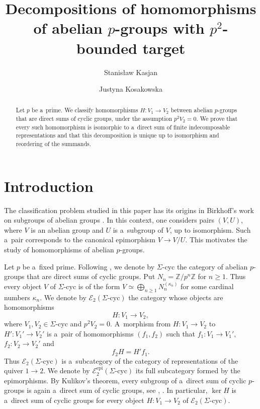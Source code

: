 \documentclass[11pt]{article}
\title{Decompositions of homomorphisms of abelian $p$-groups
	with $p^2$-bounded target}
\author{Stanisław Kasjan \and Justyna Kosakowska}
\date{}
\theoremstyle{definition}
\begin{document}
	
\maketitle


\begin{abstract}
	Let $p$ be a~prime. We classify homomorphisms $H:V_1\to V_2$
	between abelian $p$-groups that are direct sums of cyclic groups,
	under the assumption $p^2V_2=0$. We prove that every such homomorphism
	is isomorphic to a~direct sum of finite indecomposable representations
	and that this decomposition is unique up to isomorphism and reordering
	of the summands.
\end{abstract}

\section{Introduction}

The classification problem studied in this paper has its origins
in Birkhoff's work on subgroups of abelian groups \cite{birkhoff}.
In this context, one considers pairs $(V,U)$, where $V$ is an
abelian group and $U$ is a~subgroup of $V$, up to isomorphism.
Such a~pair corresponds to the canonical
epimorphism $V\longrightarrow V/U.$
This motivates the study of homomorphisms of abelian $p$-groups.


Let $p$ be a~fixed prime. Following \cite{kss-SH1}, we denote by $\Sigma\text{-cyc}$ the category
of abelian $p$-groups that are direct sums of cyclic groups. Put
$N_n=\mathbb Z/p^n\mathbb Z$ for $n\geq1$. Thus every object $V$ of
$\Sigma\text{-cyc}$ is of the form
$
V\simeq\bigoplus_{n\geq1}N_n^{(\kappa_n)}
$
for some cardinal numbers $\kappa_n$. We denote by
$\mathcal E_2(\Sigma\text{-cyc})$ the category whose objects are
homomorphisms
$$
H:V_1\longrightarrow V_2,
$$
where $V_1,V_2\in\Sigma\text{-cyc}$ and $p^2V_2=0$. A~morphism from
$H:V_1\to V_2$ to $H':V_1'\to V_2'$ is a~pair of homomorphisms
$(f_1,f_2)$ such that $f_1:V_1\to V_1'$, $f_2:V_2\to V_2'$ and
$$
f_2H=H'f_1.
$$
Thus $\mathcal E_2(\Sigma\text{-cyc})$ is a~subcategory of the category of
representations of the quiver $1\to2$.
We denote by $\mathcal E_2^{\mathrm{epi}}(\Sigma\text{-cyc})$
its full subcategory formed by the epimorphisms. By Kulikov's theorem,
every subgroup of a~direct sum of cyclic $p$-groups is again a~direct
sum of cyclic groups, see \cite[Theorem~8.5]{krylov-tuganbaev},
\cite[Theorem~13]{kaplansky}. In particular, $\ker H$ is a~direct sum
of cyclic groups for every object $H:V_1\to V_2$ of
$\mathcal E_2(\Sigma\text{-cyc})$.
\end{document}
